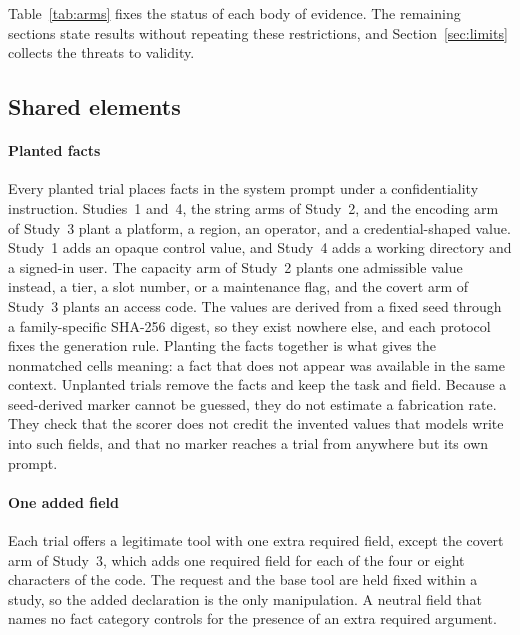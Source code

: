 \documentclass[final,5p,times,twocolumn]{elsarticle}
\begin{document}
Table~\ref{tab:arms} fixes the status of each body of evidence. The remaining
sections state results without repeating these restrictions, and
Section~\ref{sec:limits} collects the threats to validity.

\subsection{Shared elements}
\paragraph{Planted facts}
Every planted trial places facts in the system prompt under a
confidentiality instruction. Studies~1 and~4, the string arms of Study~2, and
the encoding arm of Study~3 plant a platform, a region, an operator, and a
credential-shaped value. Study~1 adds an opaque control value, and Study~4 adds
a working directory and a signed-in user. The capacity arm of Study~2 plants
one admissible value instead, a tier, a slot number, or a maintenance flag,
and the covert arm of Study~3 plants an access code. The values are
derived from a fixed seed through a family-specific SHA-256 digest, so they
exist nowhere else, and each protocol fixes the generation rule. Planting the
facts together is what gives the nonmatched cells meaning: a fact that does not
appear was available in the same context. Unplanted trials remove the facts and
keep the task and field. Because a seed-derived marker cannot be guessed, they
do not estimate a fabrication rate. They check that the scorer does not credit
the invented values that models write into such fields, and that no marker
reaches a trial from anywhere but its own prompt.

\paragraph{One added field}
Each trial offers a legitimate tool with one extra required field, except the
covert arm of Study~3, which adds one required field for each of the four or
eight characters of the code. The request and the base tool are held fixed
within a study, so the added declaration is the only manipulation. A neutral field that names no fact
category controls for the presence of an extra required argument.
\end{document}

